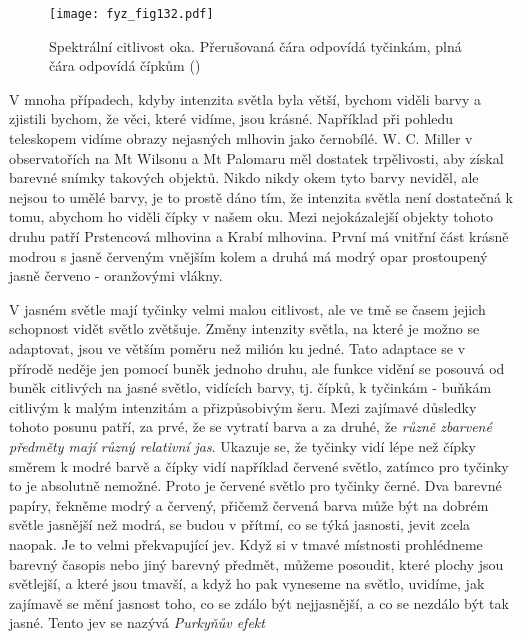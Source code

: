     \begin{figure}[ht!]  %
      \centering
      \texttt{[image: fyz\_fig132.pdf]}
      \caption{Spektrální citlivost oka. Přerušovaná čára odpovídá tyčinkám, plná čára odpovídá 
               čípkům
               (\cite[s.~470]{Feynman01})}
      \label{fyz:fig132}
    \end{figure}
    V mnoha případech, kdyby intenzita světla byla větší, bychom viděli barvy a zjistili bychom, že 
    věci, které vidíme, jsou krásné. Například při pohledu teleskopem vidíme obrazy nejasných 
    mlhovin jako černobílé. W. C. Miller v observatořích na Mt Wilsonu a Mt Palomaru měl dostatek 
    trpělivosti, aby získal barevné snímky takových objektů. Nikdo nikdy okem tyto barvy neviděl, 
    ale nejsou to umělé barvy, je to prostě dáno tím, že intenzita světla není dostatečná k tomu, 
    abychom ho viděli čípky v našem oku. Mezi nejokázalejší objekty tohoto druhu patří Prstencová 
    mlhovina a Krabí mlhovina. První má vnitřní část krásně modrou s jasně červeným vnějším kolem a 
    druhá má modrý opar prostoupený jasně červeno - oranžovými vlákny.
    
    V jasném světle mají tyčinky velmi malou citlivost, ale ve tmě se časem jejich schopnost vidět
    světlo zvětšuje. Změny intenzity světla, na které je možno se adaptovat, jsou ve větším poměru
    než milión ku jedné. Tato adaptace se v přírodě neděje jen pomocí buněk jednoho druhu, ale
    funkce vidění se posouvá od buněk citlivých na jasné světlo, vidících barvy, tj. čípků, k
    tyčinkám - buňkám citlivým k malým intenzitám a přizpůsobivým šeru. Mezi zajímavé důsledky
    tohoto posunu patří, za prvé, že se vytratí barva a za druhé, že \emph{různě zbarvené předměty
    mají různý relativní jas}. Ukazuje se, že tyčinky vidí lépe než čípky směrem k modré barvě a
    čípky vidí například červené světlo, zatímco pro tyčinky to je absolutně nemožné. Proto je
    červené světlo pro tyčinky černé. Dva barevné papíry, řekněme modrý a červený, přičemž červená
    barva může být na dobrém světle jasnější než modrá, se budou v přítmí, co se týká jasnosti,
    jevit zcela naopak. Je to velmi překvapující jev. Když si v tmavé místnosti prohlédneme barevný
    časopis nebo jiný barevný předmět, můžeme posoudit, které plochy jsou světlejší, a které jsou
    tmavší, a když ho pak vyneseme na světlo, uvidíme, jak zajímavě se mění jasnost toho, co se
    zdálo být nejjasnější, a co se nezdálo být tak jasné. Tento jev se nazývá \emph{Purkyňův efekt}
    
